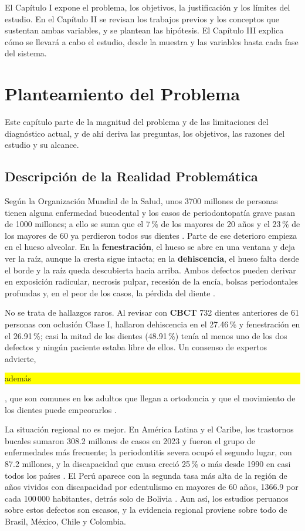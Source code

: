 \documentclass[12pt,a4paper]{article}
\newcommand{\prob}[1]{\textcolor{problema}{\textbf{#1}}}
\newcommand{\dat}[1]{\textcolor{dataset}{\textbf{#1}}}
\newcommand{\con}[1]{{\setlength{\fboxsep}{0.5pt}\colorbox{yellow}{\strut #1}}}
\newcommand{\prob}[1]{#1}
\newcommand{\dat}[1]{#1}
\newcommand{\con}[1]{#1}
\begin{document}
El Capítulo I expone el problema, los objetivos, la justificación y los
límites del estudio. En el Capítulo II se revisan los trabajos previos y
los conceptos que sustentan ambas variables, y se plantean las hipótesis.
El Capítulo III explica cómo se llevará a cabo el estudio, desde la
muestra y las variables hasta cada fase del sistema.

\section{Planteamiento del Problema}
Este capítulo parte de la magnitud del problema y de las limitaciones del
diagnóstico actual, y de ahí deriva las preguntas, los objetivos, las
razones del estudio y su alcance.

\subsection{Descripción de la Realidad Problemática}
Según la Organización Mundial de la Salud, unos 3700 millones de personas
tienen alguna enfermedad bucodental y los casos de periodontopatía grave
pasan de 1000 millones; a ello se suma que el 7\,\% de los mayores de 20
años y el 23\,\% de los mayores de 60 ya perdieron todos sus dientes
\parencite{oms2025saludbucodental}. Parte de ese deterioro empieza en el
hueso alveolar. En la \prob{fenestración}, el hueso se abre en una
ventana y deja ver la raíz, aunque la cresta sigue intacta; en la
\prob{dehiscencia}, el hueso falta desde el borde y la raíz queda
descubierta hacia arriba. Ambos defectos pueden derivar en exposición
radicular, necrosis pulpar, recesión de la encía, bolsas periodontales
profundas y, en el peor de los casos, la pérdida del diente
\parencite{liu2025fdtooth}.

No se trata de hallazgos raros. Al revisar con \dat{CBCT} 732 dientes
anteriores de 61 personas con oclusión Clase I,
\textcite{sun2022dehiscence} hallaron dehiscencia en el 27.46\,\% y
fenestración en el 26.91\,\%; casi la mitad de los dientes (48.91\,\%)
tenía al menos uno de los dos defectos y ningún paciente estaba libre de
ellos. Un consenso de expertos advierte, \con{además}, que son comunes en
los adultos que llegan a ortodoncia y que el movimiento de los dientes
puede empeorarlos \parencite{guo2026consenso}.

La situación regional no es mejor. En América Latina y el Caribe, los
trastornos bucales sumaron 308.2 millones de casos en 2023 y fueron el
grupo de enfermedades más frecuente; la periodontitis severa ocupó el
segundo lugar, con 87.2 millones, y la discapacidad que causa creció 25\,\%
o más desde 1990 en casi todos los países \parencite{gbd2026latinoamerica}.
El Perú aparece con la segunda tasa más alta de la región de años vividos
con discapacidad por edentulismo en mayores de 60 años, 1366.9 por cada
100\,000 habitantes, detrás solo de Bolivia
\parencite{gbd2026latinoamerica}. Aun así, los estudios peruanos sobre
estos defectos son escasos, y la evidencia regional proviene sobre todo de
Brasil, México, Chile y Colombia.
\end{document}
